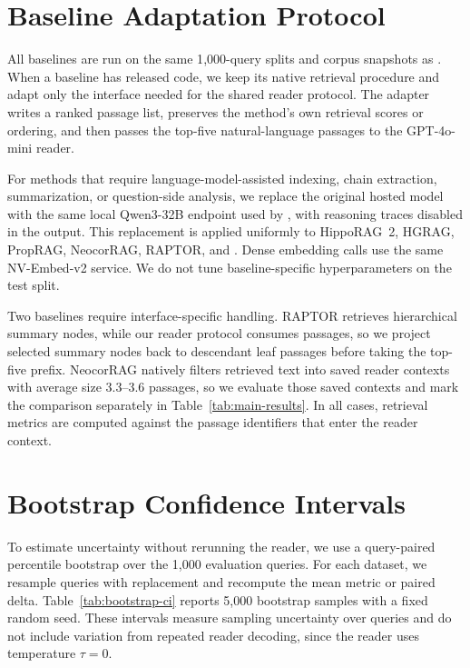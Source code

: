 \section{Baseline Adaptation Protocol}
\label{app:baseline-protocol}

All baselines are run on the same 1{,}000-query splits and corpus
snapshots as \methodname{}. When a baseline has released code, we keep
its native retrieval procedure and adapt only the interface needed for
the shared reader protocol. The adapter writes a ranked passage list,
preserves the method's own retrieval scores or ordering, and then passes
the top-five natural-language passages to the GPT-4o-mini reader.

For methods that require language-model-assisted indexing, chain
extraction, summarization, or question-side analysis, we replace the
original hosted model with the same local Qwen3-32B endpoint used by
\methodname{}, with reasoning traces disabled in the output. This
replacement is applied uniformly to HippoRAG~2, HGRAG, PropRAG,
NeocorRAG, RAPTOR, and \methodname{}. Dense embedding calls use the same
NV-Embed-v2 service. We do not tune baseline-specific hyperparameters on
the test split.

Two baselines require interface-specific handling. RAPTOR retrieves
hierarchical summary nodes, while our reader protocol consumes passages,
so we project selected summary nodes back to descendant leaf passages
before taking the top-five prefix. NeocorRAG natively filters retrieved
text into saved reader contexts with average size 3.3--3.6 passages, so
we evaluate those saved contexts and mark the comparison separately in
Table~\ref{tab:main-results}. In all cases, retrieval metrics are
computed against the passage identifiers that enter the reader context.

\section{Bootstrap Confidence Intervals}
\label{app:bootstrap-ci}

To estimate uncertainty without rerunning the reader, we use a
query-paired percentile bootstrap over the 1{,}000 evaluation queries.
For each dataset, we resample queries with replacement and recompute
the mean metric or paired delta. Table~\ref{tab:bootstrap-ci} reports
5{,}000 bootstrap samples with a fixed random seed. These intervals
measure sampling uncertainty over queries and do not include variation
from repeated reader decoding, since the reader uses temperature
$\tau=0$.

